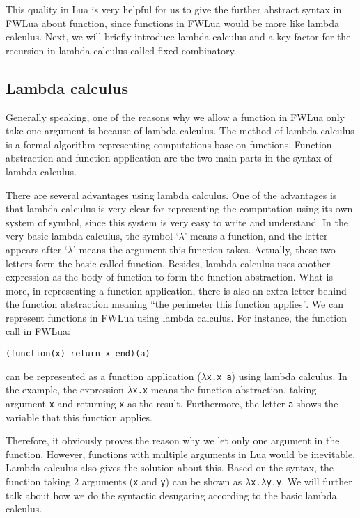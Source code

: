 This quality in Lua is very helpful for us to give the further abstract syntax in FWLua about function, since functions in FWLua would be more like lambda calculus. Next, we will briefly introduce lambda calculus and a key factor for the recursion in lambda calculus called fixed combinatory.

\subsection{Lambda calculus}
Generally speaking, one of the reasons why we allow a function in FWLua only take one argument is because of lambda calculus. The method of lambda calculus is a formal algorithm representing computations base on functions. Function abstraction and function application are the two main parts in the syntax of lambda calculus. 

There are several advantages using lambda calculus. One of the advantages is that lambda calculus is very clear for representing the computation using its own system of symbol, since this system is very easy to write and understand. In the very basic lambda calculus, the symbol `$\lambda$' means a function, and the letter appears after `$\lambda$' means the argument this function takes. Actually, these two letters form the basic called function. Besides, lambda calculus uses another expression as the body of function to form the function abstraction. What is more, in representing a function application, there is also an extra letter behind the function abstraction meaning ``the perimeter this function applies''. We can represent functions in FWLua using lambda calculus. For instance, the function call in FWLua:
\begin{flushleft}
\tt (function(x) return x end)(a)
\end{flushleft}
can be represented as a function application ({\tt $\lambda$x.x a}) using lambda calculus. In the example, the expression {\tt $\lambda$x.x} means the function abstraction, taking argument {\tt x} and returning {\tt x} as the result. Furthermore, the letter {\tt a} shows the variable that this function applies.

Therefore, it obviously proves the reason why we let only one argument in the function. However, functions with multiple arguments in Lua would be inevitable. Lambda calculus also gives the solution about this. Based on the syntax, the function taking 2 arguments ({\tt x} and {\tt y}) can be shown as {\tt $\lambda$x.$\lambda$y.y}. We will further talk about how we do the syntactic desugaring according to the basic lambda calculus.

